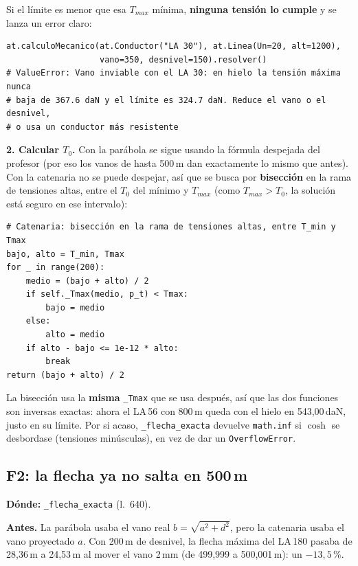 \documentclass[11pt,a4paper]{article}
\newcommand{\code}[1]{\texttt{#1}}
\newcommand{\antes}[1]{\noindent\textcolor{antes}{\textbf{Antes.}} #1\par\smallskip}
\begin{document}
Si el límite es menor que esa $T_{max}$ mínima, \textbf{ninguna tensión lo cumple} y se lanza un error claro:

\begin{lstlisting}
at.calculoMecanico(at.Conductor("LA 30"), at.Linea(Un=20, alt=1200),
                   vano=350, desnivel=150).resolver()
# ValueError: Vano inviable con el LA 30: en hielo la tensión máxima nunca
# baja de 367.6 daN y el límite es 324.7 daN. Reduce el vano o el desnivel,
# o usa un conductor más resistente
\end{lstlisting}

\textbf{2. Calcular $T_0$.} Con la parábola se sigue usando la fórmula despejada del profesor (por eso los vanos de hasta 500\,m dan exactamente lo mismo que antes). Con la catenaria no se puede despejar, así que se busca por \textbf{bisección} en la rama de tensiones altas, entre el $T_0$ del mínimo y $T_{max}$ (como $T_{max} > T_0$, la solución está seguro en ese intervalo):

\begin{lstlisting}
# Catenaria: bisección en la rama de tensiones altas, entre T_min y Tmax
bajo, alto = T_min, Tmax
for _ in range(200):
    medio = (bajo + alto) / 2
    if self._Tmax(medio, p_t) < Tmax:
        bajo = medio
    else:
        alto = medio
    if alto - bajo <= 1e-12 * alto:
        break
return (bajo + alto) / 2
\end{lstlisting}

La bisección usa la \textbf{misma} \code{\_Tmax} que se usa después, así que las dos funciones son inversas exactas: ahora el LA\,56 con 800\,m queda con el hielo en 543,00\,daN, justo en su límite. Por si acaso, \code{\_flecha\_exacta} devuelve \code{math.inf} si $\cosh$ se desbordase (tensiones minúsculas), en vez de dar un \code{OverflowError}.

\subsection{F2: la flecha ya no salta en 500\,m}

\noindent\textbf{Dónde:} \code{\_flecha\_exacta} (l.~640).\par\medskip

\antes{La parábola usaba el vano real $b=\sqrt{a^2+d^2}$, pero la catenaria usaba el vano proyectado $a$. Con 200\,m de desnivel, la flecha máxima del LA\,180 pasaba de 28,36\,m a 24,53\,m al mover el vano 2\,mm (de 499,999 a 500,001\,m): un $-13{,}5$\,\%.}
\end{document}
